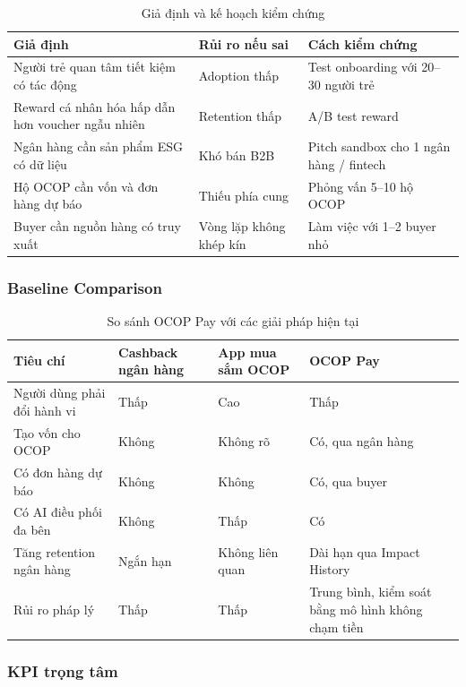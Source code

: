\documentclass[13pt,a4paper]{extarticle}
\begin{document}
\begin{table}[H]
\centering
\caption{Giả định và kế hoạch kiểm chứng}
\begin{tabular}{|p{5cm}|p{3.5cm}|p{4.5cm}|}
\hline
\textbf{Giả định} & \textbf{Rủi ro nếu sai} & \textbf{Cách kiểm chứng} \\
\hline
Người trẻ quan tâm tiết kiệm có tác động & Adoption thấp & Test onboarding với 20--30 người trẻ \\
\hline
Reward cá nhân hóa hấp dẫn hơn voucher ngẫu nhiên & Retention thấp & A/B test reward \\
\hline
Ngân hàng cần sản phẩm ESG có dữ liệu & Khó bán B2B & Pitch sandbox cho 1 ngân hàng / fintech \\
\hline
Hộ OCOP cần vốn và đơn hàng dự báo & Thiếu phía cung & Phỏng vấn 5--10 hộ OCOP \\
\hline
Buyer cần nguồn hàng có truy xuất & Vòng lặp không khép kín & Làm việc với 1--2 buyer nhỏ \\
\hline
\end{tabular}
\end{table}

\subsubsection{Baseline Comparison}

\begin{table}[H]
\centering
\caption{So sánh OCOP Pay với các giải pháp hiện tại}
\begin{tabular}{|p{4cm}|p{2.5cm}|p{2.5cm}|p{4cm}|}
\hline
\textbf{Tiêu chí} & \textbf{Cashback ngân hàng} & \textbf{App mua sắm OCOP} & \textbf{OCOP Pay} \\
\hline
Người dùng phải đổi hành vi & Thấp & Cao & Thấp \\
\hline
Tạo vốn cho OCOP & Không & Không rõ & Có, qua ngân hàng \\
\hline
Có đơn hàng dự báo & Không & Không & Có, qua buyer \\
\hline
Có AI điều phối đa bên & Không & Thấp & Có \\
\hline
Tăng retention ngân hàng & Ngắn hạn & Không liên quan & Dài hạn qua Impact History \\
\hline
Rủi ro pháp lý & Thấp & Thấp & Trung bình, kiểm soát bằng mô hình không chạm tiền \\
\hline
\end{tabular}
\end{table}

\subsubsection{KPI trọng tâm}
\end{document}
